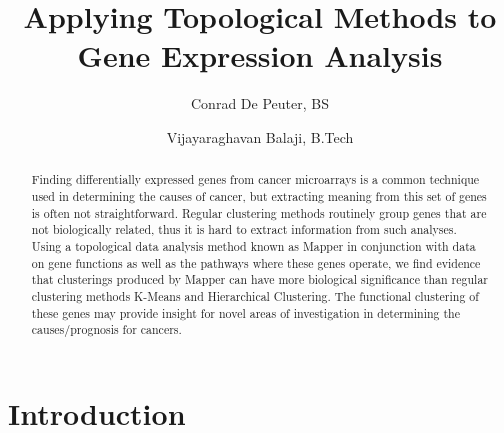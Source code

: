 \documentclass[preprint,10pt]{elsarticle}
\begin{document}
\begin{frontmatter}

\title{Applying Topological Methods to Gene Expression Analysis}


\author{Conrad De Peuter, BS}
\author{Vijayaraghavan Balaji, B.Tech}
\address{Columbia University, New York, NY, USA}

\begin{abstract}
Finding differentially expressed genes from cancer microarrays is a common technique used in determining the causes of cancer, but extracting meaning from this set of genes is often not straightforward. Regular clustering methods routinely group genes that are not biologically related, thus it is hard to extract information from such analyses. Using a topological data analysis method known as Mapper in conjunction with data on gene functions as well as the pathways where these genes operate, we find evidence that clusterings produced by Mapper can have more biological significance than regular clustering methods K-Means and Hierarchical Clustering. The functional clustering of these genes may provide insight for novel areas of investigation in determining the causes/prognosis for cancers.
\end{abstract}

\end{frontmatter}

\section{Introduction}
\end{document}
